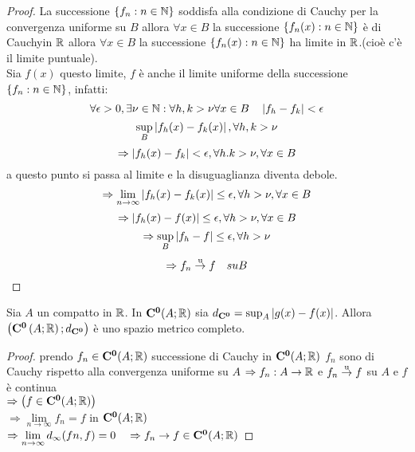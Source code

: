 \begin{proof}
	La successione $\left\{ f_n:n\in\mathbb{N}\right\}$ soddisfa alla condizione di Cauchy per la convergenza uniforme su $B$ allora $\forall x\in B$ la successione $\left\{ f_n(x) :n\in\mathbb{N} \right\}$ è di Cauchyin $ \mathbb{R}$ allora $\forall x \in B$ la successione $\left\{ f_n(x):n\in\mathbb{N} \right\}$ ha limite in $ \mathbb{R}$.(cioè c'è il limite puntuale).\\
	Sia $f(x)$ questo limite, $f$ è anche il limite uniforme della successione $\left\{ f_n:n\in\mathbb{N} \right\}$, infatti:
	\[\forall\epsilon>0, \exists\nu\in\mathbb{N}: \forall h,k>\nu \forall x\in B \quad \left|f_h-f_k\right|<\epsilon\]
	\[\sup\limits_B\left|f_h(x)-f_k(x)\right|, \forall h,k>\nu\]
	\[\Rightarrow \left|f_h(x)-f_k\right|<\epsilon,\forall h.k>\nu, \forall x \in B\]
	a questo punto si passa al limite e la disuguaglianza diventa debole.
	\[\Rightarrow \lim\limits_{n\to\infty}\left|f_h(x)-f_k(x)\right|\le\epsilon, \forall h>\nu, \forall x\in B\]
	\[\Rightarrow\left|f_h(x)-f(x)\right|\le\epsilon, \forall h>\nu, \forall x\in B\]
	\[\Rightarrow\sup\limits_B\left|f_h-f\right|\le\epsilon, \forall h>\nu\]
	\[\Rightarrow f_n \overset{\text{u}}{\to} f\quad su B\]
\end{proof}
\begin{proposition}
	\label{prop:dist_unif_sp_metr_compl}
	Sia $A$ un compatto in $ \mathbb{R}$. In $\mathbf{C^{0}}(A; \mathbb{R})$ sia $d_{\mathbf{C^{0}}}=\sup_A\left|g(x)-f(x)\right|$. Allora $\left( \mathbf{C^{0}}\left(A; \mathbb{R}\right);d_{\mathbf{C^{0}}}\right)$ è uno spazio metrico completo.
	\begin{proof}
		prendo $f_n\in \mathbf{C^{0}}(A; \mathbb{R})$ successione di Cauchy in $\mathbf{C^{0}}(A; \mathbb{R})$
		$f_n$ sono di Cauchy rispetto alla convergenza uniforme su $A$
		$\Rightarrow f_n:A\to \mathbb{R}$ e $f_n \overset{\text{u}}{\to} f$ su $A$ e $f$ è continua\\ $\Rightarrow\left(f\in \mathbf{C^{0}}(A; \mathbb{R})\right)$\\
		$\Rightarrow\lim\limits_{n\to\infty}f_n=f$ in $\mathbf{C^{0}}(A; \mathbb{R})$\\
		$\Rightarrow\lim\limits_{n\to\infty}d_{\infty}(fn,f)=0\quad\Rightarrow f_n\to f\in \mathbf{C^{0}}(A; \mathbb{R})$
	\end{proof}
\end{proposition}
\begin{corollary} %
	\label{prop:compl_dist_spm_compl}
\end{corollary}

